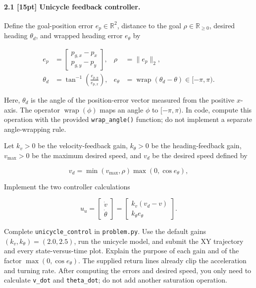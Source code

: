 \paragraph{2.1 [15pt] Unicycle feedback controller.}
Define the goal-position error $e_p\in\mathbb{R}^2$, distance to the goal
$\rho\in\mathbb{R}_{\geq 0}$, desired heading $\theta_d$, and wrapped heading
error $e_\theta$ by

\begin{align}
e_p & =
\begin{bmatrix}p_{g,x}-p_x\\p_{g,y}-p_y\end{bmatrix},
&
\rho & =\lVert e_p\rVert_2,\\
\theta_d & =\tan^{-1}\!\left(\frac{e_{p,y}}{e_{p,x}}\right),
&
e_\theta & =\operatorname{wrap}(\theta_d-\theta)\in[-\pi,\pi).
\end{align}

Here, $\theta_d$ is the angle of the position-error vector measured from the
positive $x$-axis. The operator $\operatorname{wrap}(\phi)$ maps an angle
$\phi$ to $[-\pi,\pi)$. In code, compute this operation with the provided
\texttt{wrap\_angle()} function; do not implement a separate angle-wrapping
rule.

Let $k_v>0$ be the velocity-feedback gain, $k_\theta>0$ be the
heading-feedback gain, $v_{\max}>0$ be the maximum desired speed, and $v_d$ be
the desired speed defined by

\begin{equation}
v_d=\min(v_{\max},\rho)\max(0,\cos e_\theta),
\end{equation}

Implement the two controller calculations

\begin{equation}\label{eq:unicycle-controller}
u_u=
\begin{bmatrix}\dot v\\\dot\theta\end{bmatrix}
=
\begin{bmatrix}
k_v(v_d-v)\\
k_\theta e_\theta
\end{bmatrix}.
\end{equation}

Complete \texttt{unicycle\_control} in \texttt{problem.py}. Use the default
gains $(k_v,k_\theta)=(2.0,2.5)$, run the unicycle model, and submit the XY
trajectory and every state-versus-time plot. Explain the purpose of each gain
and of the factor $\max(0,\cos e_\theta)$. The supplied return lines already
clip the acceleration and turning rate. After computing the errors and desired
speed, you only need to calculate \texttt{v\_dot} and
\texttt{theta\_dot}; do not add another saturation operation.

